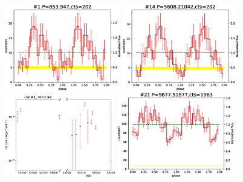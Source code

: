 \documentclass{aastex63}
\begin{document}
\begin{figure}[ht]
\centering
\includegraphics[angle =0, width = 0.45\textwidth]{./figure/LW/pfold_lc_324001_cut.eps}
\includegraphics[angle =0, width = 0.45\textwidth]{./figure/LW/pfold_lc_324002_cut.eps}
\includegraphics[angle =0, width = 0.43\textwidth]{./figure/LW/324001_lc_cut.eps}
\includegraphics[angle =0, width = 0.45\textwidth]{./figure/LW/pfold_lc_153001_cut.eps}

\end{figure}
\end{document}
